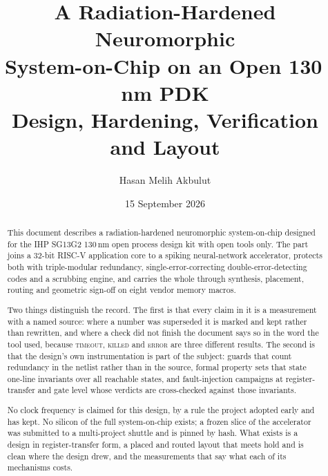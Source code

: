 \documentclass[11pt,a4paper,oneside]{report}
\title{\bfseries A Radiation-Hardened Neuromorphic\\System-on-Chip on an Open 130\,nm PDK\\[0.4em]
\large Design, Hardening, Verification and Layout}
\author{Hasan Melih Akbulut}
\date{15 September 2026}
\begin{document}
\maketitle
\thispagestyle{empty}

\begin{abstract}
\noindent
This document describes a radiation-hardened neuromorphic
system-on-chip designed for the IHP SG13G2 130\,nm open process design
kit with open tools only. The part joins a 32-bit RISC-V application
core to a spiking neural-network accelerator, protects both with
triple-modular redundancy, single-error-correcting double-error-detecting
codes and a scrubbing engine, and carries the whole through synthesis,
placement, routing and geometric sign-off on eight vendor memory macros.

Two things distinguish the record. The first is that every claim in it
is a measurement with a named source: where a number was superseded it
is marked and kept rather than rewritten, and where a check did not
finish the document says so in the word the tool used, because
\textsc{timeout}, \textsc{killed} and \textsc{error} are three
different results. The second is that the design's own instrumentation
is part of the subject: guards that count redundancy in the netlist
rather than in the source, formal property sets that state one-line
invariants over all reachable states, and fault-injection campaigns at
register-transfer and gate level whose verdicts are cross-checked
against those invariants.

No clock frequency is claimed for this design, by a rule the project
adopted early and has kept. No silicon of the full system-on-chip
exists; a frozen slice of the accelerator was submitted to a
multi-project shuttle and is pinned by hash. What exists is a design in
register-transfer form, a placed and routed layout that meets hold and
is clean where the design drew, and the measurements that say what each
of its mechanisms costs.
\end{abstract}

\clearpage
\tableofcontents
\clearpage
\listoffigures
\clearpage












\end{document}
